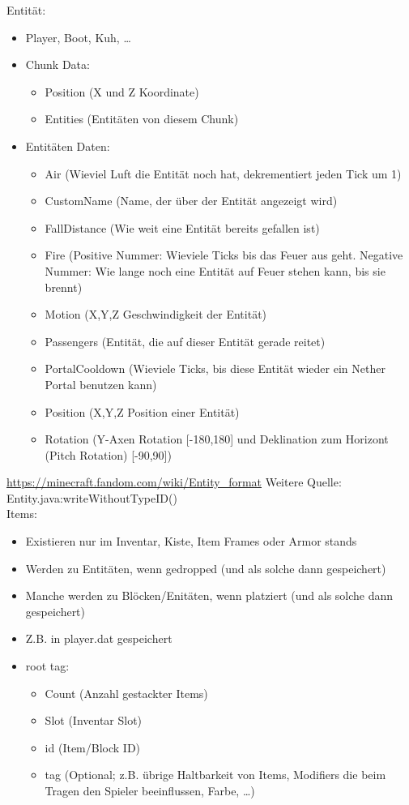 Entität:
\begin{itemize}
    \item Player, Boot, Kuh, \dots
    \item Chunk Data:
    \begin{itemize}
        \item Position (X und Z Koordinate)
        \item Entities (Entitäten von diesem Chunk)
    \end{itemize}
    \item Entitäten Daten:
    \begin{itemize}
        \item Air (Wieviel Luft die Entität noch hat, dekrementiert jeden Tick um 1)
        \item CustomName (Name, der über der Entität angezeigt wird)
        \item FallDistance (Wie weit eine Entität bereits gefallen ist)
        \item Fire (Positive Nummer: Wieviele Ticks bis das Feuer aus geht. Negative Nummer: Wie lange noch eine Entität auf Feuer stehen kann, bis sie brennt)
        \item Motion (X,Y,Z Geschwindigkeit der Entität)
        \item Passengers (Entität, die auf dieser Entität gerade reitet)
        \item PortalCooldown (Wieviele Ticks, bis diese Entität wieder ein Nether Portal benutzen kann)
        \item Position (X,Y,Z Position einer Entität)
        \item Rotation (Y-Axen Rotation [-180,180] und Deklination zum Horizont (Pitch Rotation) [-90,90])
    \end{itemize}
\end{itemize}

\url{https://minecraft.fandom.com/wiki/Entity_format}
Weitere Quelle: Entity.java:writeWithoutTypeID()\\

Items:
\begin{itemize}
    \item Existieren nur im Inventar, Kiste, Item Frames oder Armor stands
    \item Werden zu Entitäten, wenn gedropped (und als solche dann gespeichert)
    \item Manche werden zu Blöcken/Enitäten, wenn platziert (und als solche dann gespeichert) 
    \item Z.B. in player.dat gespeichert
    \item root tag:
    \begin{itemize}
        \item Count (Anzahl gestackter Items)
        \item Slot (Inventar Slot)
        \item id (Item/Block ID)
        \item tag (Optional; z.B. übrige Haltbarkeit von Items, Modifiers die beim Tragen den Spieler beeinflussen, Farbe, \dots)
    \end{itemize}
\end{itemize}

